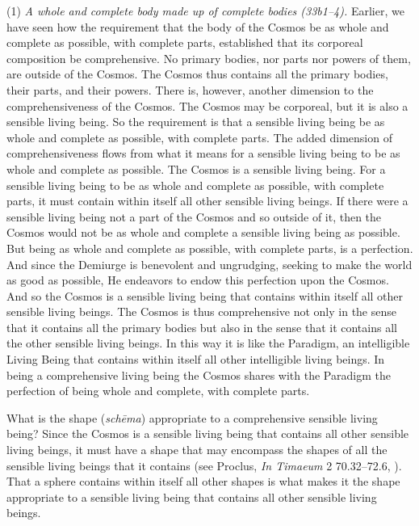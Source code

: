 (1) \emph{A whole and complete body made up of complete bodies (33b1--4).} Earlier, we have seen how the requirement that the body of the Cosmos be as whole and complete as possible, with complete parts, established that its corporeal composition be comprehensive. No primary bodies, nor parts nor powers of them, are outside of the Cosmos. The Cosmos thus contains all the primary bodies, their parts, and their powers. There is, however, another dimension to the comprehensiveness of the Cosmos. The Cosmos may be corporeal, but it is also a sensible living being. So the requirement is that a sensible living being be as whole and complete as possible, with complete parts. The added dimension of comprehensiveness flows from what it means for a sensible living being to be as whole and complete as possible.  
The Cosmos is a sensible living being. For a sensible living being to be as whole and complete as possible, with complete parts, it must contain within itself all other sensible living beings. If there were a sensible living being not a part of the Cosmos and so outside of it, then the Cosmos would not be as whole and complete a sensible living being as possible. But being as whole and complete as possible, with complete parts, is a perfection. And since the Demiurge is benevolent and ungrudging, seeking to make the world as good as possible, He endeavors to endow this perfection upon the Cosmos. And so the Cosmos is a sensible living being that contains within itself all other sensible living beings. The Cosmos is thus comprehensive not only in the sense that it contains all the primary bodies but also in the sense that it contains all the other sensible living beings. In this way it is like the Paradigm, an intelligible Living Being that contains within itself all other intelligible living beings. In being a comprehensive living being the Cosmos shares with the Paradigm the perfection of being whole and complete, with complete parts.

What is the shape (\emph{schēma}) appropriate to a comprehensive sensible living being? Since the Cosmos is a sensible living being that contains all other sensible living beings, it must have a shape that may encompass the shapes of all the sensible living beings that it contains (see Proclus, \emph{In Timaeum} 2 70.32--72.6, \citealt{Diehl:1903re}). That a sphere contains within itself all other shapes is what makes it the shape appropriate to a sensible living being that contains all other sensible living beings.


